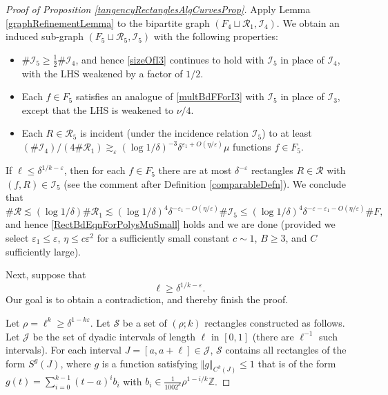 \documentclass[letterpaper, reqno,11pt]{article}
\numberwithin{equation}{section}
\newcommand{\ZZ}{\mathbb{Z}}
\newcommand{\eps}{\varepsilon}
\numberwithin{thm}{section}
\theoremstyle{remark}
\begin{document}
\begin{proof}[Proof of Proposition \ref{tangencyRectanglesAlgCurvesProp}]
Apply Lemma \ref{graphRefinementLemma} to the bipartite graph $(F_4\sqcup \mathcal{R}_1, \mathcal{I}_4)$. We obtain an induced sub-graph $(F_5\sqcup \mathcal{R}_5, \mathcal{I}_5)$ with the following properties:
\begin{itemize}
\item $\#\mathcal{I}_5\geq \frac{1}{2}\#\mathcal{I}_4$, and hence \eqref{sizeOfI3} continues to hold with $\mathcal{I}_5$ in place of $\mathcal{I}_4$, with the LHS weakened by a factor of $1/2$. 
\item Each $f\in F_5$ satisfies an analogue of \eqref{multBdFForI3} with $\mathcal{I}_5$ in place of $\mathcal{I}_3$, except that the LHS is weakened to $\nu/4$.
\item Each $R\in \mathcal{R}_5$ is incident (under the incidence relation $\mathcal{I}_5$) to at least $(\#\mathcal{I}_4)/(4\# \mathcal{R}_1)\gtrsim_\eps (\log1/\delta)^{-3}\delta^{\eps_1+O(\eta/\eps)}\mu$ functions $f\in F_5$. 
\end{itemize}


\medskip
{} 
If $\ell\leq\delta^{1/k-\eps}$, then for each $f\in F_5$ there are at most $\delta^{-\eps}$ rectangles $R\in \mathcal{R}$ with $(f,R)\in \mathcal{I}_5$ (see the comment after Definition \ref{comparableDefn}). We conclude that 
\[
\#\mathcal{R}\lesssim (\log 1/\delta)\# \mathcal{R}_1  \lesssim (\log1/\delta)^{4}\delta^{-\eps_1-O(\eta/\eps)}\#\mathcal{I}_5\leq (\log1/\delta)^{4}\delta^{-\eps-\eps_1-O(\eta/\eps)}\#F,
\]
and hence \eqref{RectBdEqnForPolysMuSmall} holds and we are done (provided we select $\eps_1\leq\eps$, $\eta\leq c\eps^2$ for a sufficiently small constant $c\sim 1$, $B\geq 3$, and $C$ sufficiently large).

Next, suppose that
\begin{equation}\label{ellLong}
\ell\geq\delta^{1/k-\eps}.
\end{equation}
Our goal is to obtain a contradiction, and thereby finish the proof. 

Let $\rho=\ell^k\geq\delta^{1-k\eps}$. Let $\mathcal{S}$ be a set of $(\rho;k)$ rectangles constructed as follows. Let $\mathcal{J}$ be the set of dyadic intervals of length $\ell$ in $[0,1]$ (there are $\ell^{-1}$ such intervals). For each interval $J=[a, a+\ell]\in\mathcal{J}$, $\mathcal{S}$ contains all rectangles of the form $S^g(J)$, where $g$ is a function satisfying $\Vert g\Vert_{C^k(J)}\leq 1$ that is of the form $g(t) = \sum_{i=0}^{k-1}(t-a)^i b_i$ with $b_i\in \frac{1}{100 2^k} \rho^{1-i/k}\ZZ$. 


\end{proof}
\end{document}
